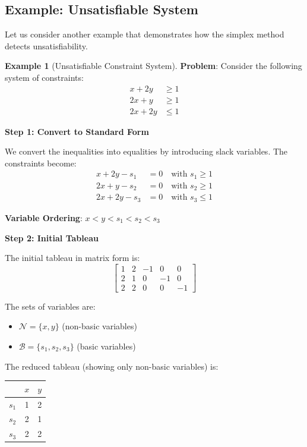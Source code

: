 \documentclass[11pt,a4paper]{article}
\theoremstyle{definition}
\newtheorem{example}{Example}[section]
\theoremstyle{plain}
\theoremstyle{remark}
\begin{document}
\subsection{Example: Unsatisfiable System}

Let us consider another example that demonstrates how the simplex method detects unsatisfiability.

\begin{example}[Unsatisfiable Constraint System]
    \textbf{Problem}: Consider the following system of constraints:
    \begin{align*}
        x + 2y &\geq 1 \\
        2x + y &\geq 1 \\
        2x + 2y &\leq 1
    \end{align*}
    
    \textbf{Step 1: Convert to Standard Form}
    
    We convert the inequalities into equalities by introducing slack variables. The constraints become:
    \begin{align*}
        x + 2y - s_1 &= 0 \quad \text{with } s_1 \geq 1 \\
        2x + y - s_2 &= 0 \quad \text{with } s_2 \geq 1 \\
        2x + 2y - s_3 &= 0 \quad \text{with } s_3 \leq 1
    \end{align*}
    
    \textbf{Variable Ordering}: $x < y < s_1 < s_2 < s_3$
    
    \textbf{Step 2: Initial Tableau}
    
    The initial tableau in matrix form is:
    \[
        \begin{bmatrix}
            1 & 2 & -1 & 0 & 0 \\
            2 & 1 & 0 & -1 & 0 \\
            2 & 2 & 0 & 0 & -1
        \end{bmatrix}
    \]
    
    The sets of variables are:
    \begin{itemize}
        \item $\mathcal{N} = \{x, y\}$ (non-basic variables)
        \item $\mathcal{B} = \{s_1, s_2, s_3\}$ (basic variables)
    \end{itemize}
    
    The reduced tableau (showing only non-basic variables) is:
    
    \begin{center}
    \begin{tabular}{c|cc}
        & $x$ & $y$ \\
        \hline
        $s_1$ & 1 & 2 \\
        $s_2$ & 2 & 1 \\
        $s_3$ & 2 & 2
    \end{tabular}
    \end{center}
    

\end{example}
\end{document}
